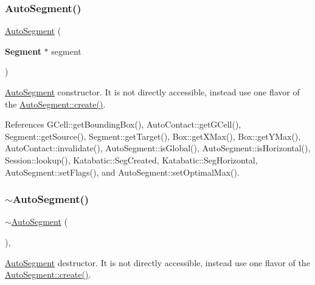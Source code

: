 \subsubsection{\texorpdfstring{Auto\+Segment()}{AutoSegment()}}
{\footnotesize\ttfamily \mbox{\hyperlink{classKatabatic_1_1AutoSegment}{Auto\+Segment}} (\begin{DoxyParamCaption}\item[{\textbf{ Segment} $\ast$}]{segment }\end{DoxyParamCaption})\hspace{0.3cm}{\ttfamily [protected]}}

\mbox{\hyperlink{classKatabatic_1_1AutoSegment}{Auto\+Segment}} constructor. It is not directly accessible, instead use one flavor of the \mbox{\hyperlink{classKatabatic_1_1AutoSegment_ab0cc9e57beeceec519cd4bd3e415569e}{Auto\+Segment\+::create()}}. 

References G\+Cell\+::get\+Bounding\+Box(), Auto\+Contact\+::get\+G\+Cell(), Segment\+::get\+Source(), Segment\+::get\+Target(), Box\+::get\+X\+Max(), Box\+::get\+Y\+Max(), Auto\+Contact\+::invalidate(), Auto\+Segment\+::is\+Global(), Auto\+Segment\+::is\+Horizontal(), Session\+::lookup(), Katabatic\+::\+Seg\+Created, Katabatic\+::\+Seg\+Horizontal, Auto\+Segment\+::set\+Flags(), and Auto\+Segment\+::set\+Optimal\+Max().

\mbox{\label{classKatabatic_1_1AutoSegment_a5d135025de0c1725d6252099c2e70e2b}} 
\subsubsection{\texorpdfstring{$\sim$\+Auto\+Segment()}{~AutoSegment()}}
{\footnotesize\ttfamily $\sim$\mbox{\hyperlink{classKatabatic_1_1AutoSegment}{Auto\+Segment}} (\begin{DoxyParamCaption}{ }\end{DoxyParamCaption})\hspace{0.3cm}{\ttfamily [protected]}, {\ttfamily [virtual]}}

\mbox{\hyperlink{classKatabatic_1_1AutoSegment}{Auto\+Segment}} destructor. It is not directly accessible, instead use one flavor of the \mbox{\hyperlink{classKatabatic_1_1AutoSegment_ab0cc9e57beeceec519cd4bd3e415569e}{Auto\+Segment\+::create()}}. 

